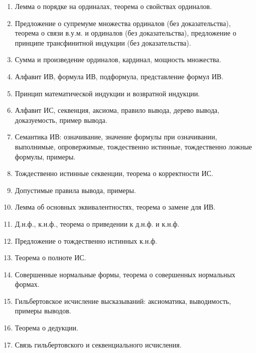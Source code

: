 \documentclass[a4paper]{article}
\theoremstyle{definition}
\begin{document}
\begin{enumerate}
\begin{proof}
\begin{enumerate}
         \item $y \in \beta$.
               Следовательно, $\beta$ - ординал.
        \end{enumerate}
       \end{proof}
 \item Лемма о порядке на ординалах, теорема о свойствах ординалов.
 \item Предложение о супремуме множества ординалов (без доказательства), теорема о связи в.у.м. и ординалов (без доказательства), предложение о принципе трансфинитной индукции (без доказательства).
 \item Сумма и произведение ординалов, кардинал, мощность множества.
 \item Алфавит ИВ, формула ИВ, подформула, представление формул ИВ.
 \item Принцип математической индукции и возвратной индукции.
 \item Алфавит ИС, секвенция, аксиома, правило вывода, дерево вывода, доказуемость, пример вывода.
 \item Семантика ИВ: означивание, значение формулы при означивании, выполнимые, опровержимые,
       тождественно истинные, тождественно ложные формулы, примеры.
 \item Тождественно истинные секвенции, теорема о корректности ИС.
 \item Допустимые правила вывода, примеры.
 \item Лемма об основных эквивалентностях, теорема о замене для ИВ.
 \item Д.н.ф., к.н.ф., теорема о приведении к д.н.ф. и к.н.ф.
 \item Предложение о тождественно истинных к.н.ф.
 \item Теорема о полноте ИС.
 \item Совершенные нормальные формы, теорема о совершенных нормальных формах.
 \item Гильбертовское исчисление высказываний: аксиоматика, выводимость, примеры выводов.
 \item Теорема о дедукции.
 \item Связь гильбертовского и секвенциального исчисления.
\end{enumerate}
\end{document}
